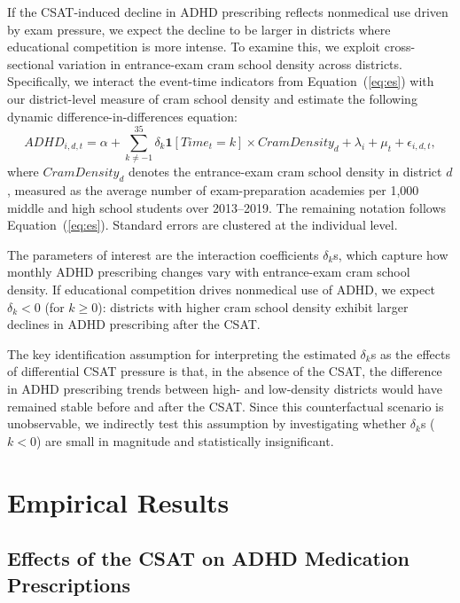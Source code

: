 \documentclass[12pt]{article}
\begin{document}
If the CSAT-induced decline in ADHD prescribing reflects nonmedical use driven by exam pressure, we expect the decline to be larger in districts where educational competition is more intense. To examine this, we exploit cross-sectional variation in entrance-exam cram school density across districts. Specifically, we interact the event-time indicators from Equation~(\ref{eq:es}) with our district-level measure of cram school density and estimate the following dynamic difference-in-differences equation:
\begin{equation}
  ADHD_{i,d,t} = \alpha + \sum_{k \neq -1}^{35} \delta_k \mathbf{1}[Time_t = k] \times CramDensity_d + \lambda_i + \mu_t + \epsilon_{i,d,t},
  \label{eq:dd}
\end{equation}
where $CramDensity_d$ denotes the entrance-exam cram school density in district $d$, measured as the average number of exam-preparation academies per 1,000 middle and high school students over 2013--2019. The remaining notation follows Equation~(\ref{eq:es}). Standard errors are clustered at the individual level.

The parameters of interest are the interaction coefficients $\delta_k$s, which capture how monthly ADHD prescribing changes vary with entrance-exam cram school density. If educational competition drives nonmedical use of ADHD, we expect $\delta_k < 0$ (for $k \geq 0$): districts with higher cram school density exhibit larger declines in ADHD prescribing after the CSAT.

The key identification assumption for interpreting the estimated $\delta_k$s as the effects of differential CSAT pressure is that, in the absence of the CSAT, the difference in ADHD prescribing trends between high- and low-density districts would have remained stable before and after the CSAT. Since this counterfactual scenario is unobservable, we indirectly test this assumption by investigating whether $\delta_k$s ($k<0$) are small in magnitude and statistically insignificant.

\section{Empirical Results}

\subsection{Effects of the CSAT on ADHD Medication Prescriptions}
\end{document}
